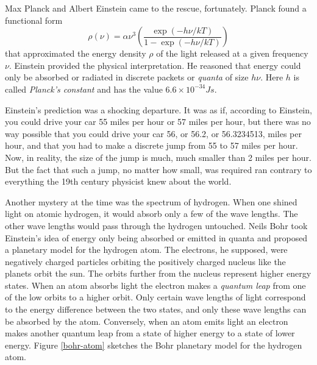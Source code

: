 Max Planck and Albert Einstein came to the rescue, fortunately. Planck
found a functional form
\begin{equation}
	\rho(\nu) = \alpha\nu^3\left(\frac{\exp(-h\nu/kT)}
					{1-\exp(-h\nu/kT)}\right)
\label{planck-eq}
\end{equation}
that approximated the energy density $\rho$ of the light
released at a given frequency $\nu$. Einstein provided the physical
interpretation. He reasoned that energy could only be absorbed or
radiated in discrete packets or \emph{quanta} of size $h\nu$. Here $h$
is called \emph{Planck's constant} and has the value $6.6\times10^{-34}
Js$.

Einstein's prediction was a shocking departure. It was as if,
according to Einstein, you could drive your car 55 miles per hour or
57 miles per hour, but there was no way possible that you could drive
your car 56, or 56.2, or 56.3234513, miles per hour, and that you had
to make a discrete jump from 55 to 57 miles per hour. Now, in reality,
the size of the jump is much, much smaller than 2 miles per hour. But
the fact that such a jump, no matter how small, was required ran
contrary to everything the 19th century physicist knew about the
world.

Another mystery at the time was the spectrum of hydrogen. When one
shined light on atomic hydrogen, it would absorb only a few of the
wave lengths. The other wave lengths would pass through the hydrogen
untouched. Neils Bohr took Einstein's idea of energy only being
absorbed or emitted in quanta and proposed a planetary model for the
hydrogen atom. The electrons, he supposed, were negatively charged
particles orbiting the positively charged nucleus like the planets
orbit the sun. The orbits further from the nucleus represent higher
energy states. When an atom absorbs light the electron makes a
\emph{quantum leap} from one of the low orbits to a higher orbit. Only
certain wave lengths of light correspond to the energy difference
between the two states, and only these wave lengths can be absorbed by
the atom. Conversely, when an atom emits light an electron makes
another quantum leap from a state of higher energy to a state of lower
energy. Figure \ref{bohr-atom} sketches the Bohr planetary model for
the hydrogen atom.

